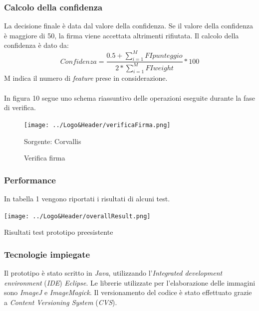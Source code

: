 \subsubsection*{Calcolo della confidenza}
\label{2.1.4.5}
La decisione finale è data dal valore della confidenza. Se il valore della confidenza è maggiore di 50, la firma viene accettata altrimenti rifiutata. Il calcolo della confidenza è dato da:
\[Confidenza = \frac{0.5+\sum\limits_{i=1}^M FIpunteggio}{2*\sum\limits_{i=1}^M FIweight} * 100\]
M indica il numero di \emph{feature} prese in considerazione.\\\\
In figura 10 segue uno schema riassuntivo delle operazioni eseguite durante la fase di verifica.
\begin{figure}[H]
\centering
\texttt{[image: ../Logo\&Header/verificaFirma.png]}
\caption{Verifica firma}Sorgente: Corvallis
\end{figure}
\subsubsection*{Performance}
\label{2.1.4.6}
In tabella 1 vengono riportati i risultati di alcuni test.
\begin{table}[H]
  \label{tbl:excel-table}
  \centering
  \texttt{[image: ../Logo\&Header/overallResult.png]}
  \caption{Risultati test prototipo preesistente}
\end{table}
\subsubsection*{Tecnologie impiegate}
\label{2.1.4.7}
Il prototipo è stato scritto in \emph{Java}, utilizzando l'\emph{Integrated development environment} (\emph{IDE}) \emph{Eclipse}. Le librerie utilizzate per l'elaborazione delle immagini sono \emph{ImageJ} e \emph{ImageMagick}. Il versionamento del codice è stato effettuato grazie a \emph{Content Versioning System} (\emph{CVS}).\\\\
